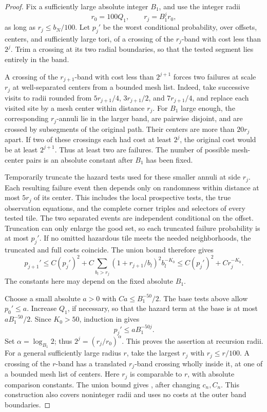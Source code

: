\begin{proof}
Fix a sufficiently large absolute integer $B_1$, and use the integer
radii
\[
 r_0=100Q_1,\qquad r_j=B_1^jr_0,
\]
as long as $r_j\leq b_N/100$. Let $p_j'$ be the worst conditional
probability, over offsets, centers, and sufficiently large tori, of a
crossing of the $r_j$-band with cost less than $2^j$.
Trim a crossing at its two radial boundaries, so that the tested
segment lies entirely in the band.

A crossing of the $r_{j+1}$-band with cost less than $2^{j+1}$
forces two failures at scale $r_j$ at well-separated centers from a
bounded mesh list. Indeed, take successive visits to radii rounded
from
$5r_{j+1}/4$, $3r_{j+1}/2$, and $7r_{j+1}/4$, and replace each
visited site by a mesh center within distance $r_j$.
For $B_1$ large enough, the corresponding $r_j$-annuli lie in the
larger band, are pairwise disjoint, and are crossed by subsegments of
the original path. Their centers are more than $20r_j$ apart.
If two of these crossings each had cost at least $2^j$, the original
cost would be at least $2^{j+1}$. Thus at least two are failures.
The number of possible mesh-center pairs is an absolute constant
after $B_1$ has been fixed.

Temporarily truncate the hazard tests used for these smaller annuli
at side $r_j$. Each resulting failure event then depends only on
randomness within distance at most $5r_j$ of its center. This includes
the local prospective tests, the true observation equations, and
the complete corner triples and selectors of every tested tile.
The two separated events are independent conditional on the offset.
Truncation can only enlarge the good set, so each truncated failure
probability is at most $p_j'$.
If no omitted hazardous tile meets the needed neighborhoods, the
truncated and full costs coincide. The union bound
 therefore gives
\begin{equation}
 p_{j+1}'\leq C(p_j')^2+
 C\sum_{b_l>r_j}(1+r_{j+1}/b_l)^2b_l^{-K_0}
 \leq C(p_j')^2+C r_j^{-K_0}.
 \label{screen:path-recursion}
\end{equation}
The constants here may depend on the fixed absolute $B_1$.

Choose a small absolute $a>0$ with
$Ca\leq B_1^{-50}/2$. The base tests above allow $p_0'\leq a$.
Increase $Q_1$, if necessary, so that the hazard term at the base is
at most $aB_1^{-50}/2$. Since $K_0>50$, induction in
 gives
\[
 p_j'\leq aB_1^{-50j}.
\]
Set $\alpha=\log_{B_1}2$; thus
$2^j=(r_j/r_0)^\alpha$. This proves the assertion at recursion radii.
For a general sufficiently large radius $r$, take the largest $r_j$
with $r_j\leq r/100$. A crossing of the $r$-band has a translated
$r_j$-band crossing wholly inside it, at one of a bounded mesh list
of centers. Here $r_j$ is comparable to $r$, with absolute comparison
constants. The union bound gives
, after changing $c_n,C_n$.
This construction also covers noninteger radii and uses no costs at
the outer band boundaries.
\end{proof}

